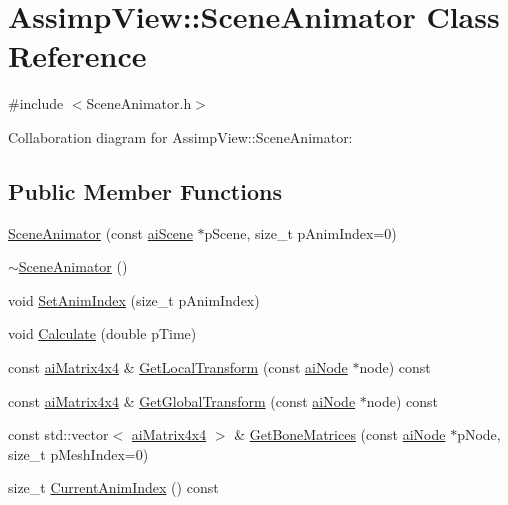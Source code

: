 \hypertarget{class_assimp_view_1_1_scene_animator}{\section{Assimp\+View\+:\+:Scene\+Animator Class Reference}
\label{class_assimp_view_1_1_scene_animator}
}


{\ttfamily \#include $<$Scene\+Animator.\+h$>$}



Collaboration diagram for Assimp\+View\+:\+:Scene\+Animator\+:
\subsection*{Public Member Functions}
\begin{DoxyCompactItemize}
\item 
\hyperlink{class_assimp_view_1_1_scene_animator_ad3f0975b87a7b83e6a53bb932dc87c5c}{Scene\+Animator} (const \hyperlink{structai_scene}{ai\+Scene} $\ast$p\+Scene, size\+\_\+t p\+Anim\+Index=0)
\item 
\hyperlink{class_assimp_view_1_1_scene_animator_a204cb5b04afb15e6223e1b0f016d12fc}{$\sim$\+Scene\+Animator} ()
\item 
void \hyperlink{class_assimp_view_1_1_scene_animator_a248309cdd1e5c8af66247aa14b174609}{Set\+Anim\+Index} (size\+\_\+t p\+Anim\+Index)
\item 
void \hyperlink{class_assimp_view_1_1_scene_animator_ac2fca81d4eb40a272065b5cf032db38b}{Calculate} (double p\+Time)
\item 
const \hyperlink{structai_matrix4x4}{ai\+Matrix4x4} \& \hyperlink{class_assimp_view_1_1_scene_animator_a49d269f5bafdf8c265a1ce0c0d3d6663}{Get\+Local\+Transform} (const \hyperlink{structai_node}{ai\+Node} $\ast$node) const 
\item 
const \hyperlink{structai_matrix4x4}{ai\+Matrix4x4} \& \hyperlink{class_assimp_view_1_1_scene_animator_a9b0eba92e2845fa9d5b2412e764c1075}{Get\+Global\+Transform} (const \hyperlink{structai_node}{ai\+Node} $\ast$node) const 
\item 
const std\+::vector$<$ \hyperlink{structai_matrix4x4}{ai\+Matrix4x4} $>$ \& \hyperlink{class_assimp_view_1_1_scene_animator_aa7dfe2a1c9320bf616bfefefca10f6cd}{Get\+Bone\+Matrices} (const \hyperlink{structai_node}{ai\+Node} $\ast$p\+Node, size\+\_\+t p\+Mesh\+Index=0)
\item 
\hypertarget{class_assimp_view_1_1_scene_animator_a3b56d5171e533ecc5a56cf317c378269}{size\+\_\+t \hyperlink{class_assimp_view_1_1_scene_animator_a3b56d5171e533ecc5a56cf317c378269}{Current\+Anim\+Index} () const }\label{class_assimp_view_1_1_scene_animator_a3b56d5171e533ecc5a56cf317c378269}


\end{DoxyCompactItemize}
